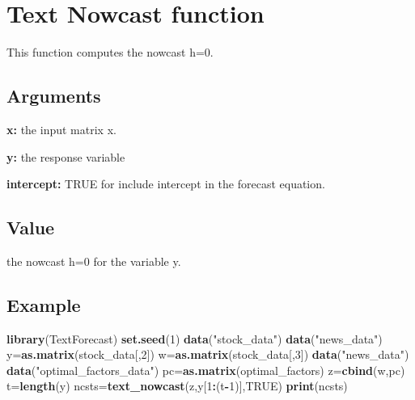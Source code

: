\documentclass[]{article}
\newenvironment{Shaded}{\begin{snugshade}}{\end{snugshade}}
\newcommand{\KeywordTok}[1]{\textcolor[rgb]{0.13,0.29,0.53}{\textbf{#1}}}
\newcommand{\DecValTok}[1]{\textcolor[rgb]{0.00,0.00,0.81}{#1}}
\newcommand{\StringTok}[1]{\textcolor[rgb]{0.31,0.60,0.02}{#1}}
\newcommand{\OtherTok}[1]{\textcolor[rgb]{0.56,0.35,0.01}{#1}}
\newcommand{\OperatorTok}[1]{\textcolor[rgb]{0.81,0.36,0.00}{\textbf{#1}}}
\newcommand{\NormalTok}[1]{#1}
\begin{document}
\section{Text Nowcast function}\label{text-nowcast-function}

This function computes the nowcast h=0.

\subsection{Arguments}\label{arguments-9}

\textbf{x:} the input matrix x.

\textbf{y:} the response variable

\textbf{intercept:} TRUE for include intercept in the forecast equation.

\subsection{Value}\label{value-9}

the nowcast h=0 for the variable y.

\subsection{Example}\label{example-8}

\begin{Shaded}
\begin{Highlighting}[]
 \KeywordTok{library}\NormalTok{(TextForecast)}
 \KeywordTok{set.seed}\NormalTok{(}\DecValTok{1}\NormalTok{)}
 \KeywordTok{data}\NormalTok{(}\StringTok{"stock_data"}\NormalTok{)}
  \KeywordTok{data}\NormalTok{(}\StringTok{"news_data"}\NormalTok{)}
\NormalTok{ y=}\KeywordTok{as.matrix}\NormalTok{(stock_data[,}\DecValTok{2}\NormalTok{])}
\NormalTok{ w=}\KeywordTok{as.matrix}\NormalTok{(stock_data[,}\DecValTok{3}\NormalTok{])}
 \KeywordTok{data}\NormalTok{(}\StringTok{"news_data"}\NormalTok{)}
 \KeywordTok{data}\NormalTok{(}\StringTok{"optimal_factors_data"}\NormalTok{)}
\NormalTok{ pc=}\KeywordTok{as.matrix}\NormalTok{(optimal_factors)}
\NormalTok{ z=}\KeywordTok{cbind}\NormalTok{(w,pc)}
\NormalTok{ t=}\KeywordTok{length}\NormalTok{(y)}
\NormalTok{ ncsts=}\KeywordTok{text_nowcast}\NormalTok{(z,y[}\DecValTok{1}\OperatorTok{:}\NormalTok{(t}\OperatorTok{-}\DecValTok{1}\NormalTok{)],}\OtherTok{TRUE}\NormalTok{)}
 \KeywordTok{print}\NormalTok{(ncsts)}
\end{Highlighting}
\end{Shaded}
\end{document}
